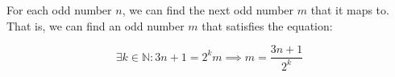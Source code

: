 \documentclass{article}
\begin{document}
For each odd number \begin{math}n\end{math}, we can find the next odd
number \begin{math}m\end{math} that it maps to. That is, we can find
an odd number \begin{math}m\end{math} that satisfies the equation:

\begin{displaymath}
\exists k \in \mathbb{N} : 3n+1 = 2^{k}m \implies m = \frac{3n+1}{2^{k}}
\end{displaymath}
\end{document}
